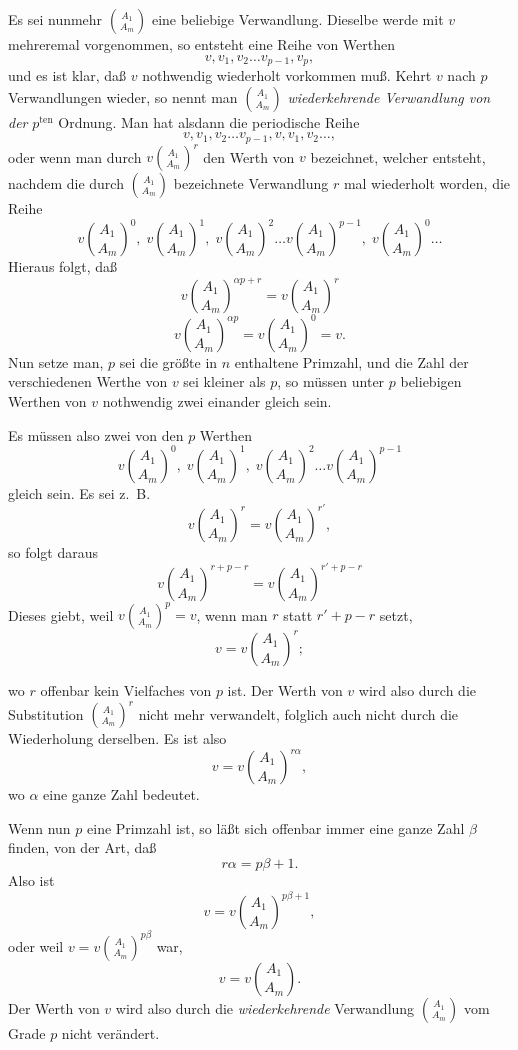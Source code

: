 \documentclass{article}
\begin{document}
Es sei nunmehr $\binom{A_1}{A_m}$ eine beliebige Verwandlung. Dieselbe werde mit $v$ mehreremal vorgenommen, so entsteht eine Reihe von Werthen
\[ v, v_1, v_2 \ldots v_{p-1}, v_p, \]
und es ist klar, daß $v$ nothwendig wiederholt vorkommen muß. Kehrt $v$ nach $p$ Verwandlungen wieder, so nennt man $\binom{A_1}{A_m}$ \emph{wiederkehrende Verwandlung von der} $p^{\text{ten}}$ Ordnung. Man hat alsdann die periodische Reihe
\[ v, v_1, v_2 \ldots v_{p-1}, v, v_1, v_2 \ldots, \]
oder wenn man durch $v\binom{A_1}{A_m}^{r}$ den Werth von $v$ bezeichnet, welcher entsteht, nachdem die durch $\binom{A_1}{A_m}$ bezeichnete Verwandlung $r$ mal wiederholt worden, die Reihe
\[ v\binom{A_1}{A_m}^{0}, \; v\binom{A_1}{A_m}^{1}, \; v\binom{A_1}{A_m}^{2} \ldots v\binom{A_1}{A_m}^{p-1}, \; v\binom{A_1}{A_m}^{0} \ldots \]
Hieraus folgt, daß
\[ v\binom{A_1}{A_m}^{\alpha p + r} = v\binom{A_1}{A_m}^{r} \]
\[ v\binom{A_1}{A_m}^{\alpha p} = v\binom{A_1}{A_m}^{0} = v. \]
Nun setze man, $p$ sei die größte in $n$ enthaltene Primzahl, und die Zahl der verschiedenen Werthe von $v$ sei kleiner als $p$, so müssen unter $p$ beliebigen Werthen von $v$ nothwendig zwei einander gleich sein.

Es müssen also zwei von den $p$ Werthen
\[ v\binom{A_1}{A_m}^{0}, \; v\binom{A_1}{A_m}^{1}, \; v\binom{A_1}{A_m}^{2} \ldots v\binom{A_1}{A_m}^{p-1} \]
gleich sein. Es sei z.\ B.
\[ v\binom{A_1}{A_m}^{r} = v\binom{A_1}{A_m}^{r'}, \]
so folgt daraus
\[ v\binom{A_1}{A_m}^{r + p - r} = v\binom{A_1}{A_m}^{r' + p - r} \]
Dieses giebt, weil $v\binom{A_1}{A_m}^{p} = v$, wenn man $r$ statt $r' + p - r$ setzt,
\[ v = v\binom{A_1}{A_m}^{r}; \]

wo $r$ offenbar kein Vielfaches von $p$ ist. Der Werth von $v$ wird also durch die Substitution $\binom{A_1}{A_m}^{r}$ nicht mehr verwandelt, folglich auch nicht durch die Wiederholung derselben. Es ist also
\[ v = v\binom{A_1}{A_m}^{r\alpha}, \]
wo $\alpha$ eine ganze Zahl bedeutet.

Wenn nun $p$ eine Primzahl ist, so läßt sich offenbar immer eine ganze Zahl $\beta$ finden, von der Art, daß
\[ r\alpha = p\beta + 1. \]
Also ist
\[ v = v\binom{A_1}{A_m}^{p\beta + 1}, \]
oder weil $v = v\binom{A_1}{A_m}^{p\beta}$ war,
\[ v = v\binom{A_1}{A_m}. \]
Der Werth von $v$ wird also durch die \emph{wiederkehrende} Verwandlung $\binom{A_1}{A_m}$ vom Grade $p$ nicht verändert.
\end{document}

